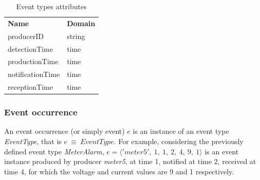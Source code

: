 \begin{table}[h!]
\begin{center}
\begin{tabular}{ll}
\rowcolor{tcA}
\textbf{\textcolor{tcB}{Name}} & \textbf{\textcolor{tcB}{Domain}}\\
producerID & string\\
detectionTime & time\\
productionTime & time\\
notificationTime & time\\
receptionTime & time\\
\end{tabular}
\caption {Event types attributes}
\label{tab:evtAttributes}
\end{center}
\end{table}
\subsubsection{Event occurrence}
 An event occurrence (or simply event) $e$ is an instance of an event type \textit{EventType}, that is $e\ \equiv \ EventType$. For example, considering the  previously defined event type \textit{MeterAlarm}, $e=\langle 'meter5',\ 1,\ 1,\ 2,\ 4,\ 9,\ 1 \rangle$ is an event instance produced by producer \textit{meter5}, at time 1, notified at time 2, received at time 4, for which the voltage and current values are 9 and 1 respectively. 
 
